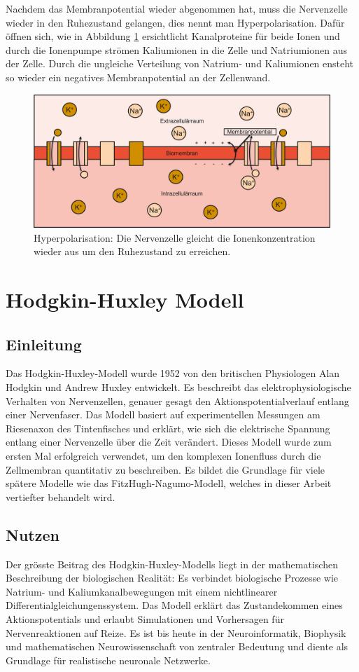 \begin{refsection}
Nachdem das Membranpotential wieder abgenommen hat, muss die Nervenzelle wieder in den Ruhezustand gelangen, dies nennt
man Hyperpolarisation.
Dafür öffnen sich, wie in Abbildung \ref{fig:Hyperpolarisation} ersichtlicht Kanalproteine für beide Ionen und durch die
Ionenpumpe strömen Kaliumionen in die Zelle und Natriumionen aus der Zelle.
Durch die ungleiche Verteilung von Natrium- und Kaliumionen ensteht so wieder ein negatives Membranpotential an der Zellenwand.
\begin{figure}[h]
    \centering
    \includegraphics[width=\textwidth]{papers/nerven/Bilder/Vorgang5.png}
    \caption{Hyperpolarisation: Die Nervenzelle gleicht die Ionenkonzentration wieder aus um den Ruhezustand zu erreichen.}
    \label{fig:Hyperpolarisation}
\end{figure}
\cite{nerven:InaLammers.31.08.2015}
\section{Hodgkin-Huxley Modell}
\subsection{Einleitung}
Das Hodgkin-Huxley-Modell wurde 1952 von den britischen Physiologen Alan Hodgkin und Andrew Huxley entwickelt. Es beschreibt das elektrophysiologische Verhalten von Nervenzellen, genauer gesagt den Aktionspotentialverlauf entlang einer Nervenfaser. Das Modell basiert auf experimentellen Messungen am Riesenaxon des Tintenfisches und erklärt, wie sich die elektrische Spannung entlang einer Nervenzelle über die Zeit verändert. Dieses Modell wurde zum ersten Mal erfolgreich verwendet, um den komplexen Ionenfluss durch die Zellmembran quantitativ zu beschreiben. Es bildet die Grundlage für viele spätere Modelle wie das FitzHugh-Nagumo-Modell, welches in dieser Arbeit vertiefter behandelt wird.
\cite{nerven:InaLammers.31.08.2015}
\subsection{Nutzen}
Der grösste Beitrag des Hodgkin-Huxley-Modells liegt in der mathematischen Beschreibung der biologischen Realität: Es verbindet biologische Prozesse wie Natrium- und Kaliumkanalbewegungen mit einem nichtlinearer Differentialgleichungenssystem. Das Modell erklärt das Zustandekommen eines Aktionspotentials und erlaubt Simulationen und Vorhersagen für Nervenreaktionen auf Reize. Es ist bis heute in der Neuroinformatik, Biophysik und mathematischen Neurowissenschaft von zentraler Bedeutung und diente als Grundlage für realistische neuronale Netzwerke.
\cite{nerven:InaLammers.31.08.2015}

\end{refsection}
